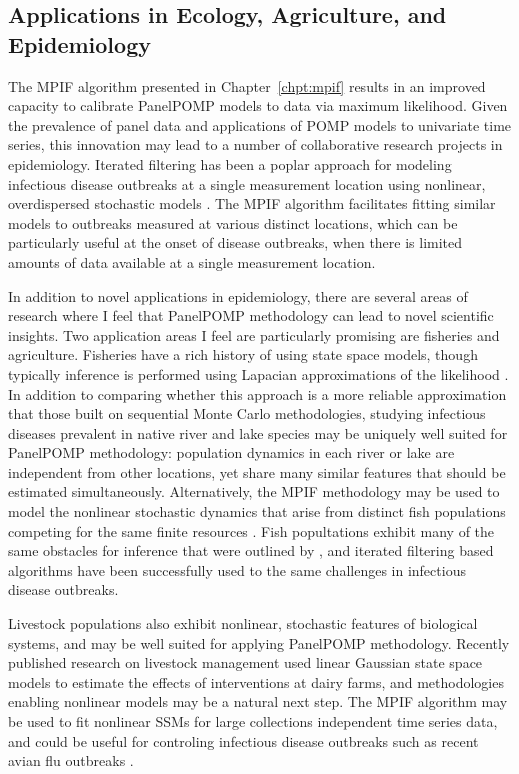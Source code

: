 \subsection*{Applications in Ecology, Agriculture, and Epidemiology}

The MPIF algorithm presented in Chapter~\ref{chpt:mpif} results in an improved capacity to calibrate PanelPOMP models to data via maximum likelihood.
Given the prevalence of panel data and applications of POMP models to univariate time series, this innovation may lead to a number of collaborative research projects in epidemiology.
Iterated filtering has been a poplar approach for modeling infectious disease outbreaks at a single measurement location using nonlinear, overdispersed stochastic models \citep[e.g.,][]{stocks20}. 
The MPIF algorithm facilitates fitting similar models to outbreaks measured at various distinct locations, which can be particularly useful at the onset of disease outbreaks, when there is limited amounts of data available at a single measurement location.

In addition to novel applications in epidemiology, there are several areas of research where I feel that PanelPOMP methodology can lead to novel scientific insights.
Two application areas I feel are particularly promising are fisheries and agriculture.
Fisheries have a rich history of using state space models, though typically inference is performed using Lapacian approximations of the likelihood \citep[e.g.,][]{auger17}.
In addition to comparing whether this approach is a more reliable approximation that those built on sequential Monte Carlo methodologies, studying infectious diseases prevalent in native river and lake species may be uniquely well suited for PanelPOMP methodology: population dynamics in each river or lake are independent from other locations, yet share many similar features that should be estimated simultaneously.
Alternatively, the MPIF methodology may be used to model the nonlinear stochastic dynamics that arise from distinct fish populations competing for the same finite resources \citep{rosenthal22}.
Fish popultations exhibit many of the same obstacles for inference that were outlined by \citet{bjornstad01}, and iterated filtering based algorithms have been successfully used to the same challenges in infectious disease outbreaks.

Livestock populations also exhibit nonlinear, stochastic features of biological systems, and may be well suited for applying PanelPOMP methodology.
Recently published research on livestock management \citep{skolstrup22} used linear Gaussian state space models to estimate the effects of interventions at dairy farms, and methodologies enabling nonlinear models may be a natural next step.
The MPIF algorithm may be used to fit nonlinear SSMs for large collections independent time series data, and could be useful for controling infectious disease outbreaks such as recent avian flu outbreaks \citep{pinotti24}.

